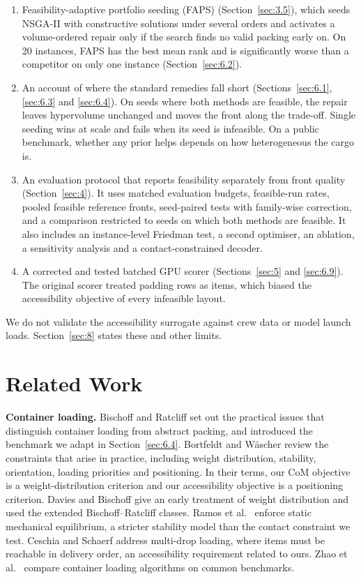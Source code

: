 \documentclass[journal]{IEEEtran}
\providecommand{\tightlist}{\setlength{\itemsep}{0pt}\setlength{\parskip}{0pt}}
\begin{document}
\begin{enumerate}
\def\labelenumi{\arabic{enumi}.}
\tightlist
\item
  Feasibility-adaptive portfolio seeding (FAPS) (Section~\ref{sec:3.5}), which seeds NSGA-II with constructive solutions under several orders and activates a volume-ordered repair only if the search finds no valid packing early on. On 20 instances, FAPS has the best mean rank and is significantly worse than a competitor on only one instance (Section~\ref{sec:6.2}).
\item
  An account of where the standard remedies fall short (Sections~\ref{sec:6.1}, \ref{sec:6.3} and \ref{sec:6.4}). On seeds where both methods are feasible, the repair leaves hypervolume unchanged and moves the front along the trade-off. Single seeding wins at scale and fails when its seed is infeasible. On a public benchmark, whether any prior helps depends on how heterogeneous the cargo is.
\item
  An evaluation protocol that reports feasibility separately from front quality (Section~\ref{sec:4}). It uses matched evaluation budgets, feasible-run rates, pooled feasible reference fronts, seed-paired tests with family-wise correction, and a comparison restricted to seeds on which both methods are feasible. It also includes an instance-level Friedman test, a second optimiser, an ablation, a sensitivity analysis and a contact-constrained decoder.
\item
  A corrected and tested batched GPU scorer (Sections~\ref{sec:5} and \ref{sec:6.9}). The original scorer treated padding rows as items, which biased the accessibility objective of every infeasible layout.
\end{enumerate}

We do not validate the accessibility surrogate against crew data or model launch loads. Section~\ref{sec:8} states these and other limits.

\section{Related Work}\label{sec:2}

\textbf{Container loading.} Bischoff and Ratcliff \cite{bischoff1995} set out the practical issues that distinguish container loading from abstract packing, and introduced the benchmark we adapt in Section~\ref{sec:6.4}. Bortfeldt and Wäscher \cite{bortfeldt2013} review the constraints that arise in practice, including weight distribution, stability, orientation, loading priorities and positioning. In their terms, our CoM objective is a weight-distribution criterion and our accessibility objective is a positioning criterion. Davies and Bischoff \cite{davies1999} give an early treatment of weight distribution and used the extended Bischoff--Ratcliff classes. Ramos et al.~\cite{ramos2016} enforce static mechanical equilibrium, a stricter stability model than the contact constraint we test. Ceschia and Schaerf \cite{ceschia2013} address multi-drop loading, where items must be reachable in delivery order, an accessibility requirement related to ours. Zhao et al.~\cite{zhao2016} compare container loading algorithms on common benchmarks.
\end{document}
